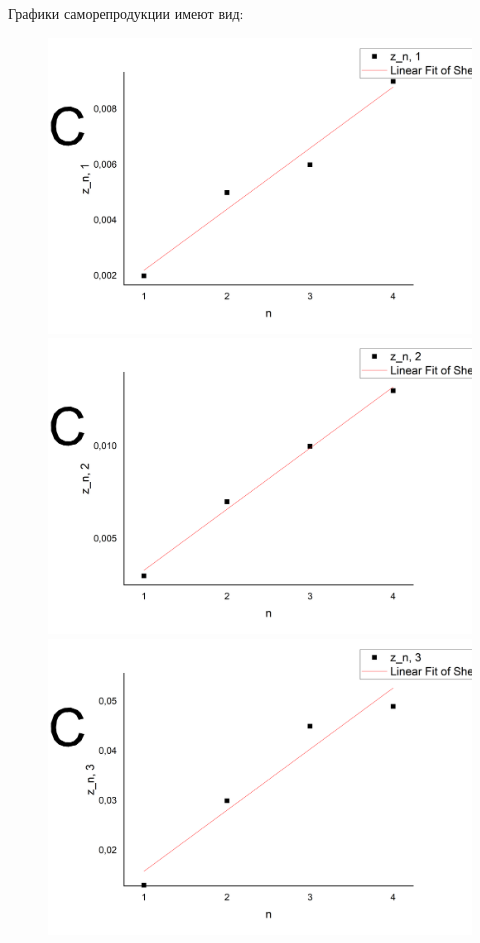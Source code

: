 \documentclass[a4paper,12pt]{article}
\begin{document}
\newpage
Графики саморепродукции имеют вид:
	\begin{figure}[ht!]
		\includegraphics[scale=0.2]{1.png}\hfill
		\includegraphics[scale=0.2]{2.png}\hfill
		\includegraphics[scale=0.2]{3.png}\hfill

\end{figure}
\end{document}
